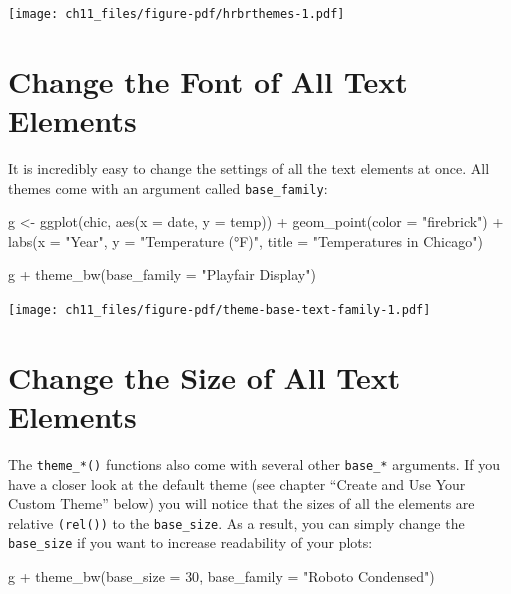 \documentclass[
  letterpaper,
]{scrbook}
\newenvironment{Shaded}{\begin{snugshade}}{\end{snugshade}}
\newcommand{\AttributeTok}[1]{\textcolor[rgb]{0.40,0.45,0.13}{#1}}
\newcommand{\DecValTok}[1]{\textcolor[rgb]{0.68,0.00,0.00}{#1}}
\newcommand{\FunctionTok}[1]{\textcolor[rgb]{0.28,0.35,0.67}{#1}}
\newcommand{\NormalTok}[1]{\textcolor[rgb]{0.00,0.23,0.31}{#1}}
\newcommand{\OtherTok}[1]{\textcolor[rgb]{0.00,0.23,0.31}{#1}}
\newcommand{\SpecialCharTok}[1]{\textcolor[rgb]{0.37,0.37,0.37}{#1}}
\newcommand{\StringTok}[1]{\textcolor[rgb]{0.13,0.47,0.30}{#1}}
\begin{document}
\texttt{[image: ch11\_files/figure-pdf/hrbrthemes-1.pdf]}

\section{Change the Font of All Text
Elements}\label{change-the-font-of-all-text-elements}

It is incredibly easy to change the settings of all the text elements at
once. All themes come with an argument called \texttt{base\_family}:

\begin{Shaded}
\begin{Highlighting}[]
\NormalTok{g }\OtherTok{\textless{}{-}} \FunctionTok{ggplot}\NormalTok{(chic, }\FunctionTok{aes}\NormalTok{(}\AttributeTok{x =}\NormalTok{ date, }\AttributeTok{y =}\NormalTok{ temp)) }\SpecialCharTok{+}
  \FunctionTok{geom\_point}\NormalTok{(}\AttributeTok{color =} \StringTok{"firebrick"}\NormalTok{) }\SpecialCharTok{+}
  \FunctionTok{labs}\NormalTok{(}\AttributeTok{x =} \StringTok{"Year"}\NormalTok{, }\AttributeTok{y =} \StringTok{"Temperature (°F)"}\NormalTok{,}
       \AttributeTok{title =} \StringTok{"Temperatures in Chicago"}\NormalTok{)}

\NormalTok{g }\SpecialCharTok{+} \FunctionTok{theme\_bw}\NormalTok{(}\AttributeTok{base\_family =} \StringTok{"Playfair Display"}\NormalTok{)}
\end{Highlighting}
\end{Shaded}

\texttt{[image: ch11\_files/figure-pdf/theme-base-text-family-1.pdf]}

\section{Change the Size of All Text
Elements}\label{change-the-size-of-all-text-elements}

The \texttt{theme\_*()} functions also come with several other
\texttt{base\_*} arguments. If you have a closer look at the default
theme (see chapter ``Create and Use Your Custom Theme'' below) you will
notice that the sizes of all the elements are relative \texttt{(rel())}
to the \texttt{base\_size}. As a result, you can simply change the
\texttt{base\_size} if you want to increase readability of your plots:

\begin{Shaded}
\begin{Highlighting}[]
\NormalTok{g }\SpecialCharTok{+} \FunctionTok{theme\_bw}\NormalTok{(}\AttributeTok{base\_size =} \DecValTok{30}\NormalTok{, }\AttributeTok{base\_family =} \StringTok{"Roboto Condensed"}\NormalTok{)}
\end{Highlighting}
\end{Shaded}
\end{document}
